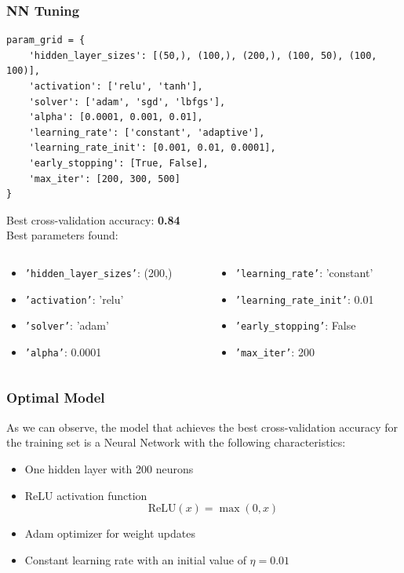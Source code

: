 \documentclass{beamer}
\begin{document}
\begin{frame}[fragile]
\frametitle{NN Tuning}
\lstset{style=PythonStyle}
\begin{lstlisting}
param_grid = {
    'hidden_layer_sizes': [(50,), (100,), (200,), (100, 50), (100, 100)],
    'activation': ['relu', 'tanh'],
    'solver': ['adam', 'sgd', 'lbfgs'],
    'alpha': [0.0001, 0.001, 0.01],
    'learning_rate': ['constant', 'adaptive'],
    'learning_rate_init': [0.001, 0.01, 0.0001],
    'early_stopping': [True, False],
    'max_iter': [200, 300, 500]
}
\end{lstlisting}
Best cross-validation accuracy: \textbf{0.84} \\
Best parameters found:
\begin{columns}
    \begin{column}{0.45\textwidth}
        \begin{itemize}
            \item \texttt{'hidden\_layer\_sizes'}: (200,)
            \item \texttt{'activation'}: 'relu'
            \item \texttt{'solver'}: 'adam'
            \item \texttt{'alpha'}: 0.0001
        \end{itemize}
    \end{column}
    \begin{column}{0.55\textwidth}
        \begin{itemize}
            \item \texttt{'learning\_rate'}: 'constant'
            \item \texttt{'learning\_rate\_init'}: 0.01
            \item \texttt{'early\_stopping'}: False
            \item \texttt{'max\_iter'}: 200
        \end{itemize}
    \end{column}
\end{columns}
\end{frame}

\begin{frame}
\frametitle{Optimal Model}
As we can observe, the model that achieves the best cross-validation accuracy for the training set is a Neural Network with the following characteristics:
\vspace{0.5cm}
\begin{itemize}
    \item One hidden layer with 200 neurons
    \item ReLU activation function\[\text{ReLU}(x) = \max(0, x)\]
    \item Adam optimizer for weight updates
    \item Constant learning rate with an initial value of $\eta = 0.01$
\end{itemize}
\end{frame}
\end{document}
